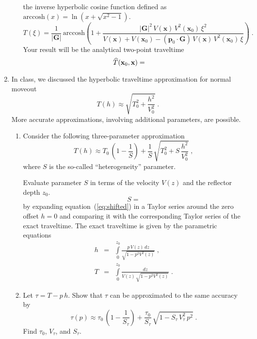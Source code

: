 \begin{enumerate}
\begin{enumerate}
{  the inverse hyperbolic cosine function defined as $\mbox{arccosh}(x)
  = \ln\left(x + \sqrt{x^2-1}\right)$.}  
  \begin{equation}
  \label{eq:t1} T(\xi) =
  \frac{1}{|\mathbf{G}|}\,\mbox{arccosh}\left(1 +
  \frac{|\mathbf{G}|^2\,V(\mathbf{x})\,V^2(\mathbf{x}_0)\,\xi^2}
  {V(\mathbf{x})+V(\mathbf{x}_0) - (\mathbf{p}_0 \cdot
  \mathbf{G})\,V(\mathbf{x})\,V^2(\mathbf{x}_0)\,\xi}\right)\;.
  \end{equation} 
  Your result will be the analytical two-point
  traveltime 
  \begin{eqnarray} 
  \label{eq:t2}
    \widehat{T}(\mathbf{x}_0,\mathbf{x}) = & & \hfill \ 
  \end{eqnarray}
\end{enumerate}

\item In class, we discussed the hyperbolic traveltime approximation for normal moveout
  \begin{equation}
  \label{eq:hyper2}
  T(h) \approx \sqrt{T_0^2 + \frac{h^2}{V_0^2}}\;.
\end{equation}
More accurate approximations, involving additional parameters, are possible.
\begin{enumerate}
\item Consider the following three-parameter approximation
  \begin{equation}
    \label{eq:shifted}
    T(h) \approx T_0\,\left(1-\frac{1}{S}\right) + 
\frac{1}{S}\,\sqrt{T_0^2+S\,\frac{h^2}{V_0^2}}\;,
  \end{equation}
  where $S$ is the so-called ``heterogeneity'' parameter. 

Evaluate parameter $S$ in terms of the velocity $V(z)$ and the reflector depth $z_0$.
\begin{equation}
  \label{eq:a}
  S =
\end{equation}
by expanding
  equation~(\ref{eq:shifted}) in a Taylor series around the zero offset
  $h=0$ and comparing it with the corresponding Taylor series of the exact
  traveltime. The exact traveltime is given by the parametric equations
  \begin{eqnarray}
\label{eq:xofp}
h & = & \int\limits_0^{z_0} \frac{p\,V(z)\,dz}{\sqrt{1-p^2 V^2(z)}}\;, \\
\label{eq:tofp}
T & = & \int\limits_0^{z_0} \frac{dz}{V(z)\,\sqrt{1-p^2 V^2(z)}}\;.
\end{eqnarray}
\item Let $\tau = T-p\,h$. Show that $\tau$ can be approximated to the same accuracy by
\begin{equation}
    \label{eq:tauofp}
    \tau(p) \approx \displaystyle \tau_0\,\left(1-\frac{1}{S_{\tau}}\right) + 
\frac{\tau_0}{S_{\tau}}\,\sqrt{1-S_{\tau}\,{V_{\tau}^2}\,p^2}\;.
  \end{equation}
Find $\tau_0$, $V_{\tau}$, and $S_{\tau}$.
\end{enumerate}
\end{enumerate}


